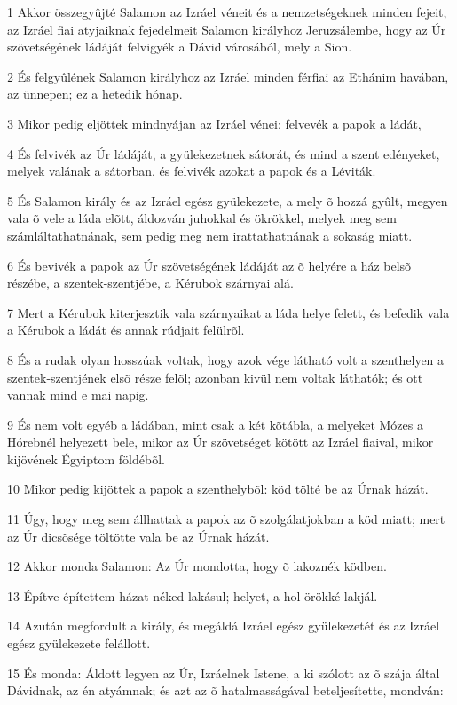 \par 1 Akkor összegyûjté Salamon az Izráel véneit és a nemzetségeknek minden fejeit, az Izráel fiai atyjaiknak fejedelmeit Salamon királyhoz Jeruzsálembe, hogy az Úr szövetségének ládáját felvigyék a Dávid városából, mely a Sion.
\par 2 És felgyûlének Salamon királyhoz az Izráel minden férfiai az Ethánim havában, az ünnepen; ez a hetedik hónap.
\par 3 Mikor pedig eljöttek mindnyájan az Izráel vénei: felvevék a papok a ládát,
\par 4 És felvivék az Úr ládáját, a gyülekezetnek sátorát, és mind a szent edényeket, melyek valának a sátorban, és felvivék azokat a papok és a Léviták.
\par 5 És Salamon király és az Izráel egész gyülekezete, a mely õ hozzá gyûlt, megyen vala õ vele a láda elõtt, áldozván juhokkal és ökrökkel, melyek meg sem számláltathatnának, sem pedig meg nem irattathatnának a sokaság miatt.
\par 6 És bevivék a papok az Úr szövetségének ládáját az õ helyére a ház belsõ részébe, a szentek-szentjébe, a Kérubok szárnyai alá.
\par 7 Mert a Kérubok kiterjesztik vala szárnyaikat a láda helye felett, és befedik vala a Kérubok a ládát és annak rúdjait felülrõl.
\par 8 És a rudak olyan hosszúak voltak, hogy azok vége látható volt a szenthelyen a szentek-szentjének elsõ része felõl; azonban kivül nem voltak láthatók; és ott vannak mind e mai napig.
\par 9 És nem volt egyéb a ládában, mint csak a két kõtábla, a melyeket Mózes a Hórebnél helyezett bele, mikor az Úr szövetséget kötött az Izráel fiaival, mikor kijövének Égyiptom földébõl.
\par 10 Mikor pedig kijöttek a papok a szenthelybõl: köd tölté be az Úrnak házát.
\par 11 Úgy, hogy meg sem állhattak a papok az õ szolgálatjokban a köd miatt; mert az Úr dicsõsége töltötte vala be az Úrnak házát.
\par 12 Akkor monda Salamon: Az Úr mondotta, hogy õ lakoznék ködben.
\par 13 Építve építettem házat néked lakásul; helyet, a hol örökké lakjál.
\par 14 Azután megfordult a király, és megáldá Izráel egész gyülekezetét és az Izráel egész gyülekezete felállott.
\par 15 És monda: Áldott legyen az Úr, Izráelnek Istene, a ki szólott az õ szája által Dávidnak, az én atyámnak; és azt az õ hatalmasságával beteljesítette, mondván:
